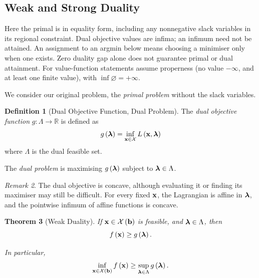 \documentclass[11pt]{article}
\newtheorem{theorem}{Theorem}[section]
\theoremstyle{definition}
\newtheorem{definition}[theorem]{Definition}
\theoremstyle{remark}
\newtheorem{remark}[theorem]{Remark}
\newcommand{\pqty}[1]{\left(#1\right)}
\newcommand{\functiondomain}[3]{#1:#2\to #3}
\newcommand{\RR}{\mathbb{R}}
\begin{document}
\subsection{Weak and Strong Duality}
Here the primal is in equality form, including any nonnegative slack variables
in its regional constraint. Dual objective values are infima; an infimum need not
be attained. An assignment to an argmin below means choosing a minimiser only
when one exists. Zero duality gap alone does not guarantee primal or dual attainment.
For value-function statements assume properness (no value \(-\infty\), and at least
one finite value), with \(\inf\varnothing=+\infty\).


We consider our original problem, the \emph{primal problem} without the slack variables. 

\begin{definition}[Dual Objective Function, Dual Problem]\label{optim-unit-0030}
    The \emph{dual objective function} \(\functiondomain{g}{\Lambda}{\RR}\) is defined as
    \[
        g\pqty{\vb*{\lambda}} = \inf_{\vb{x} \in \mathcal{X}} L \pqty{\vb{x}, \vb*{\lambda}}
    \]
    where \(\Lambda\) is the dual feasible set.

    The \emph{dual problem} is maximising \(g\pqty{\vb*{\lambda}}\) subject to \(\vb*{\lambda} \in \Lambda\).
\end{definition}

\begin{remark}\label{optim-unit-0031}
    The dual objective is concave, although evaluating it or finding its maximiser may still be difficult. For every fixed \(\vb{x}\), the Lagrangian is affine in \(\vb*{\lambda}\), and the pointwise infimum of affine functions is concave.
\end{remark}

\begin{theorem}[Weak Duality]\label{optim-unit-0032}
    \label{weak-duality}%
    If \(\vb{x} \in \mathcal{X} \pqty{\vb{b}}\) is feasible, and \(\vb*{\lambda} \in \Lambda\), then
    \[
        f\pqty{\vb{x}} \geq g\pqty{\vb*{\lambda}}.
    \]

    In particular,
    \[
        \inf_{\vb{x} \in \mathcal{X} \pqty{\vb{b}}} f\pqty{\vb{x}} \geq \sup_{\vb*{\lambda} \in \Lambda} g\pqty{\vb*{\lambda}}.
    \]
\end{theorem}
\end{document}
